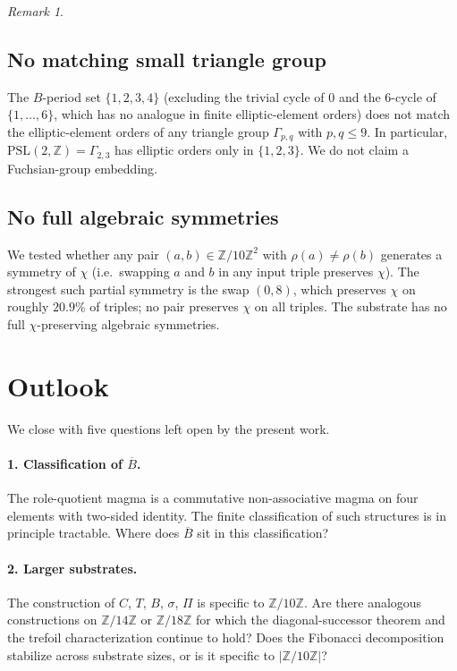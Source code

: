 \documentclass[submission,copyright,creativecommons]{eptcs}
\theoremstyle{plain}
\theoremstyle{definition}
\theoremstyle{remark}
\newtheorem{remark}[theorem]{Remark}
\begin{document}
\begin{remark}
\subsection{No matching small triangle group}

The $B$-period set $\{1, 2, 3, 4\}$ (excluding the trivial cycle of $0$
and the $6$-cycle of $\{1, \dots, 6\}$, which has no analogue in finite
elliptic-element orders) does not match the elliptic-element orders of any
triangle group $\Gamma_{p, q}$ with $p, q \leq 9$. In particular,
$\mathrm{PSL}(2, \mathbb{Z}) = \Gamma_{2, 3}$ has elliptic orders only in
$\{1, 2, 3\}$. We do not claim a Fuchsian-group embedding.

\subsection{No full algebraic symmetries}

We tested whether any pair $(a, b) \in \mathbb{Z}/10\mathbb{Z}^2$ with
$\rho(a) \neq \rho(b)$ generates a symmetry of $\chi$ (i.e.\ swapping $a$
and $b$ in any input triple preserves $\chi$). The strongest such partial
symmetry is the swap $(0, 8)$, which preserves $\chi$ on roughly $20.9\%$
of triples; no pair preserves $\chi$ on all triples. The substrate has no
full $\chi$-preserving algebraic symmetries.

\section{Outlook}\label{sec:outlook}

We close with five questions left open by the present work.

\paragraph{1. Classification of $\overline{B}$.}
The role-quotient magma is a commutative non-associative magma on four
elements with two-sided identity. The finite classification of such
structures is in principle tractable. Where does $\overline{B}$ sit in this
classification?

\paragraph{2. Larger substrates.}
The construction of $C$, $T$, $B$, $\sigma$, $\Pi$ is specific to
$\mathbb{Z}/10\mathbb{Z}$. Are there analogous constructions on
$\mathbb{Z}/14\mathbb{Z}$ or $\mathbb{Z}/18\mathbb{Z}$ for which the
diagonal-successor theorem and the trefoil characterization continue to
hold? Does the Fibonacci decomposition stabilize across substrate sizes,
or is it specific to $|\mathbb{Z}/10\mathbb{Z}|$?


\end{remark}
\end{document}
